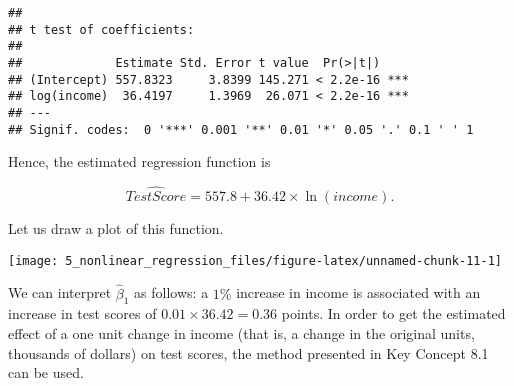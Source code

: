 \documentclass[
]{article}
\newenvironment{Shaded}{\begin{snugshade}}{\end{snugshade}}
\newcommand{\AttributeTok}[1]{\textcolor[rgb]{0.77,0.63,0.00}{#1}}
\newcommand{\CommentTok}[1]{\textcolor[rgb]{0.56,0.35,0.01}{\textit{#1}}}
\newcommand{\DecValTok}[1]{\textcolor[rgb]{0.00,0.00,0.81}{#1}}
\newcommand{\FunctionTok}[1]{\textcolor[rgb]{0.00,0.00,0.00}{#1}}
\newcommand{\NormalTok}[1]{#1}
\newcommand{\OtherTok}[1]{\textcolor[rgb]{0.56,0.35,0.01}{#1}}
\newcommand{\SpecialCharTok}[1]{\textcolor[rgb]{0.00,0.00,0.00}{#1}}
\newcommand{\StringTok}[1]{\textcolor[rgb]{0.31,0.60,0.02}{#1}}
\begin{document}
\begin{verbatim}
## 
## t test of coefficients:
## 
##             Estimate Std. Error t value  Pr(>|t|)    
## (Intercept) 557.8323     3.8399 145.271 < 2.2e-16 ***
## log(income)  36.4197     1.3969  26.071 < 2.2e-16 ***
## ---
## Signif. codes:  0 '***' 0.001 '**' 0.01 '*' 0.05 '.' 0.1 ' ' 1
\end{verbatim}

Hence, the estimated regression function is

\[\widehat{TestScore} = 557.8 + 36.42 \times \ln(income).\]

Let us draw a plot of this function.

\begin{Shaded}
\end{Shaded}

\begin{center}\texttt{[image: 5\_nonlinear\_regression\_files/figure-latex/unnamed-chunk-11-1]} \end{center}

We can interpret \(\hat{\beta}_1\) as follows: a \(1\%\) increase in
income is associated with an increase in test scores of
\(0.01 \times 36.42 = 0.36\) points. In order to get the estimated
effect of a one unit change in income (that is, a change in the original
units, thousands of dollars) on test scores, the method presented in Key
Concept 8.1 can be used.
\end{document}
